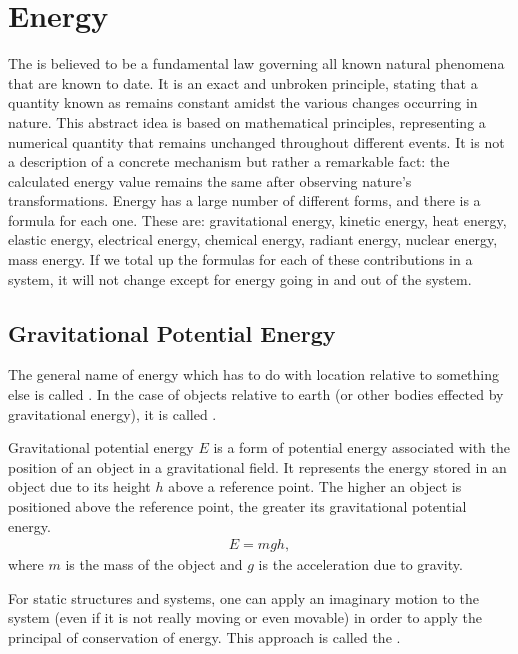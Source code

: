 \section{Energy}

The  is believed to be a fundamental law governing all known natural phenomena that are known to date. It is an exact and unbroken principle, stating that a quantity known as  remains constant amidst the various changes occurring in nature. This abstract idea is based on mathematical principles, representing a numerical quantity that remains unchanged throughout different events. It is not a description of a concrete mechanism but rather a remarkable fact: the calculated energy value remains the same after observing nature's transformations. Energy has a large number of different forms, and there is a formula for each one. These are: gravitational energy, kinetic energy, heat energy, elastic energy, electrical energy, chemical energy, radiant energy, nuclear energy, mass energy. If we total up the formulas for each of these contributions in a system, it will not change except for energy going in and out of the system.

\subsection{Gravitational Potential Energy}

The general name of energy which has to do with location relative to something else is called . In the case of objects relative to earth (or other bodies effected by gravitational energy), it is called .
	
\begin{defn}
	Gravitational potential energy $E$ is a form of potential energy associated with the position of an object in a gravitational field. It represents the energy stored in an object due to its height $h$ above a reference point. The higher an object is positioned above the reference point, the greater its gravitational potential energy.
	\begin{align}
		E = mgh,
	\end{align}
	where $m$ is the mass of the object and $g$ is the acceleration due to gravity.
\end{defn}

For static structures and systems, one can apply an imaginary motion to the system (even if it is not really moving or even movable) in order to apply the principal of conservation of energy. This approach is called the .

